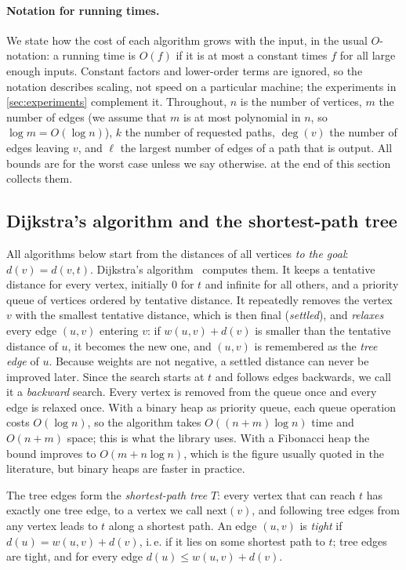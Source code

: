 \documentclass[11pt,a4paper]{article}
\makeatletter
\newcommand{\ie}{i.\,e.\@\xspace}
\makeatother
\begin{document}
\paragraph{Notation for running times.} We state how the cost of each algorithm grows with the input, in the usual
$O$-notation: a running time is $O(f)$ if it is at most a constant times $f$ for all large enough inputs. Constant
factors and lower-order terms are ignored, so the notation describes scaling, not speed on a particular machine;
the experiments in \cref{sec:experiments} complement it. Throughout, $n$ is the number of vertices, $m$ the number
of edges (we assume that $m$ is at most polynomial in $n$, so $\log m=O(\log n)$), $k$ the number of
requested paths, $\deg(v)$ the number of edges leaving $v$, and $\ell$ the largest number of edges of a path that is
output. All bounds are for the worst case unless we say otherwise.  at the end of this section
collects them.

\subsection{Dijkstra's algorithm and the shortest-path tree}\label{sec:dijkstra}
All algorithms below start from the distances of all vertices \emph{to the goal}: $d(v)=d(v,t)$.
Dijkstra's algorithm~\cite{dijkstra1959} computes them. It keeps a tentative distance for every vertex, initially
$0$ for $t$ and infinite for all others, and a priority queue of vertices ordered by tentative distance. It
repeatedly removes the vertex $v$ with the smallest tentative distance, which is then final (\emph{settled}), and
\emph{relaxes} every edge $(u,v)$ entering $v$: if $w(u,v)+d(v)$ is smaller than the tentative distance of $u$, it
becomes the new one, and $(u,v)$ is remembered as the \emph{tree edge} of $u$. Because weights are not negative, a
settled distance can never be improved later. Since the search starts at $t$ and follows edges backwards, we call it
a \emph{backward} search. Every vertex is removed from the queue once and every edge is relaxed once. With a binary
heap as priority queue, each queue operation costs $O(\log n)$, so the algorithm takes $O((n+m)\log n)$ time and
$O(n+m)$ space; this is what the library uses. With a Fibonacci heap the bound improves to $O(m+n\log n)$, which is
the figure usually quoted in the literature, but binary heaps are faster in practice.

The tree edges form the \emph{shortest-path tree} $T$: every vertex that can reach $t$ has exactly one tree edge,
to a vertex we call $\mathrm{next}(v)$, and following tree edges from any vertex leads to $t$ along a shortest path.
An edge $(u,v)$ is \emph{tight} if $d(u)=w(u,v)+d(v)$, \ie{} if it lies on some shortest path to $t$; tree edges are
tight, and for every edge $d(u)\le w(u,v)+d(v)$.
\end{document}
